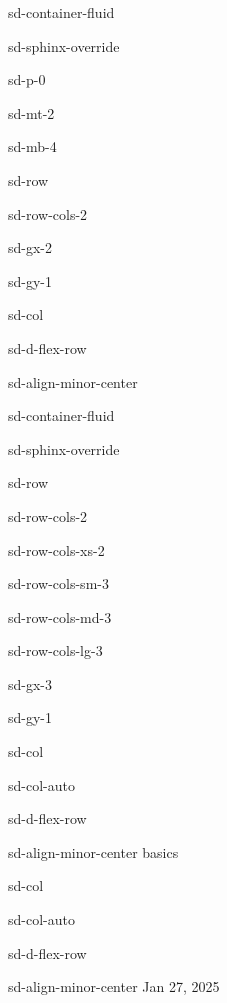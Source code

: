 \documentclass[letterpaper,10pt,english]{jupyterBook}
\begin{document}
\begin{sphinxuseclass}{sd-container-fluid}
\begin{sphinxuseclass}{sd-sphinx-override}
\begin{sphinxuseclass}{sd-p-0}
\begin{sphinxuseclass}{sd-mt-2}
\begin{sphinxuseclass}{sd-mb-4}
\begin{sphinxuseclass}{sd-row}
\begin{sphinxuseclass}{sd-row-cols-2}
\begin{sphinxuseclass}{sd-gx-2}
\begin{sphinxuseclass}{sd-gy-1}
\begin{sphinxuseclass}{sd-col}
\begin{sphinxuseclass}{sd-d-flex-row}
\begin{sphinxuseclass}{sd-align-minor-center}
\begin{sphinxuseclass}{sd-container-fluid}
\begin{sphinxuseclass}{sd-sphinx-override}
\begin{sphinxuseclass}{sd-row}
\begin{sphinxuseclass}{sd-row-cols-2}
\begin{sphinxuseclass}{sd-row-cols-xs-2}
\begin{sphinxuseclass}{sd-row-cols-sm-3}
\begin{sphinxuseclass}{sd-row-cols-md-3}
\begin{sphinxuseclass}{sd-row-cols-lg-3}
\begin{sphinxuseclass}{sd-gx-3}
\begin{sphinxuseclass}{sd-gy-1}
\begin{sphinxuseclass}{sd-col}
\begin{sphinxuseclass}{sd-col-auto}
\begin{sphinxuseclass}{sd-d-flex-row}
\begin{sphinxuseclass}{sd-align-minor-center}
\sphinxAtStartPar
basics

\end{sphinxuseclass}
\end{sphinxuseclass}
\end{sphinxuseclass}
\end{sphinxuseclass}
\begin{sphinxuseclass}{sd-col}
\begin{sphinxuseclass}{sd-col-auto}
\begin{sphinxuseclass}{sd-d-flex-row}
\begin{sphinxuseclass}{sd-align-minor-center}
\sphinxAtStartPar
Jan 27, 2025


\end{sphinxuseclass}
\end{sphinxuseclass}
\end{sphinxuseclass}
\end{sphinxuseclass}
\end{sphinxuseclass}
\end{sphinxuseclass}
\end{sphinxuseclass}
\end{sphinxuseclass}
\end{sphinxuseclass}
\end{sphinxuseclass}
\end{sphinxuseclass}
\end{sphinxuseclass}
\end{sphinxuseclass}
\end{sphinxuseclass}
\end{sphinxuseclass}
\end{sphinxuseclass}
\end{sphinxuseclass}
\end{sphinxuseclass}
\end{sphinxuseclass}
\end{sphinxuseclass}
\end{sphinxuseclass}
\end{sphinxuseclass}
\end{sphinxuseclass}
\end{sphinxuseclass}
\end{sphinxuseclass}
\end{sphinxuseclass}
\end{document}
